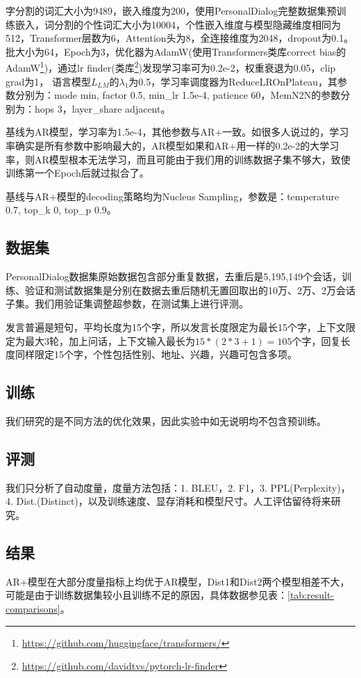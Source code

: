 \documentclass[letterpaper]{article} %
\DeclareRobustCommand{\citeext}[1]{\cite[#1]{#1}}
\begin{document}
\begin{CJK*}{UTF8}{gbsn}
字分割的词汇大小为9489，嵌入维度为200，使用PersonalDialog完整数据集预训练嵌入，词分割的个性词汇大小为10004，个性嵌入维度与模型隐藏维度相同为512，Transformer层数为6，Attention头为8，全连接维度为2048，dropout为0.1。
批大小为64，Epoch为3，优化器为AdamW(使用Transformers类库correct bias的\\AdamW\footnote{\url{https://github.com/huggingface/transformers/}})，通过lr finder\citeext{Smith2015}(类库\footnote{\url{https://github.com/davidtvs/pytorch-lr-finder}})发现学习率可为0.2e-2，权重衰退为0.05，clip grad为1，
语言模型$L_{LM}$的$\lambda_1$为0.5，学习率调度器为ReduceLROnPlateau，其参数分别为：mode min, factor 0.5, min\_lr 1.5e-4, patience 60，MemN2N的参数分别为：hops 3，layer\_share adjacent。

基线为AR模型，学习率为1.5e-4，其他参数与AR+一致。如很多人说过的，学习率确实是所有参数中影响最大的，AR模型如果和AR+用一样的0.2e-2的大学习率，则AR模型根本无法学习，而且可能由于我们用的训练数据子集不够大，致使训练第一个Epoch后就过拟合了。

基线与AR+模型的decoding策略均为Nucleus Sampling\citeext{Holtzman2019}，参数是：temperature 0.7, top\_k 0, top\_p 0.9。

\subsection[Datasets]{数据集} 
PersonalDialog数据集原始数据包含部分重复数据，去重后是5,195,149个会话，训练、验证和测试数据集是分别在数据去重后随机无置回取出的10万、2万、2万会话子集。我们用验证集调整超参数，在测试集上进行评测。

发言普遍是短句，平均长度为15个字，所以发言长度限定为最长15个字，上下文限定为最大3轮，加上问话，上下文输入最长为$15*(2*3+1)=105$个字，回复长度同样限定15个字，个性包括性别、地址、兴趣，兴趣可包含多项。

\subsection[Training]{训练}
我们研究的是不同方法的优化效果，因此实验中如无说明均不包含预训练。

\subsection[Evaluation]{评测} 
我们只分析了自动度量，度量方法包括：1. BLEU\citeext{Papineni2002}，2. F1，3. PPL(Perplexity)，4. Dist.(Distinct)\citeext{Li2016}，以及训练速度、显存消耗和模型尺寸。人工评估留待将来研究。

\subsection[Result]{结果} 
AR+模型在大部分度量指标上均优于AR模型，Dist1和Dist2两个模型相差不大，可能是由于训练数据集较小且训练不足的原因，具体数据参见表：\ref{tab:result-comparisons}。


\end{CJK*}
\end{document}
